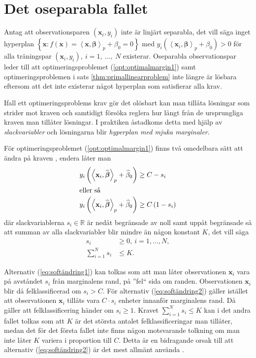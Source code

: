\documentclass[a4paper, 12pt]{report}
\theoremstyle{definition}
\theoremstyle{remark}
\newcommand{\bfbeta}{{\boldsymbol{\beta}}}
\newcommand{\bfx}{\mathbf{x}}
\newcommand{\llangle}{\left\langle}
\newcommand{\rrangle}{\right\rangle}
\newcommand{\inner}[2]{\llangle #1, #2 \rrangle}
\begin{document}
\section{Det oseparabla fallet}
Antag att observationsparen $\left(\mathbf{x}_i, y_i\right)$ inte är linjärt separabla, det vill säga inget hyperplan $\left\{\mathbf{x} : f\left(\mathbf{x}\right) = \inner{\bfx}{\bfbeta}_p + \beta_0 = 0 \right\}$ med $y_i\left(\inner{\bfx_i}{\bfbeta}_p+\beta_0\right)>0$ för alla träningspar $\left(\mathbf{x}_i,y_i\right),~i=1,~\dots,~N$ existerar. Oseparabla observationspar leder till att optimeringsproblemet (\ref{opt:optimalmargin1}) samt optimeringsproblemen i sats \ref{thm:primallinearproblem} inte längre är lösbara eftersom att det inte existerar något hyperplan som satisfierar alla krav.

Ifall ett optimeringsproblems krav gör det olösbart kan man tillåta lösningar som strider mot kraven och samtidigt försöka reglera hur långt från de ursprungliga kraven man tillåter lösningar. I praktiken åstadkoms detta med hjälp av \emph{slackvariabler} och lösningarna blir \emph{hyperplan med mjuka marginaler}.

För optimeringsproblemet (\ref{opt:optimalmargin1}) finns två omedelbara sätt att ändra på kraven \cite{ESL}, endera låter man
\begin{align}
	y_i\left(\inner{\bfx_i}{\widehat{\bfbeta}}_p+\widehat{\beta}_0\right) &\geq C-s_i\label{eq:softändring1}\\
	\intertext{eller så}
	y_i\left(\inner{\bfx_i}{\widehat{\bfbeta}}_p+\widehat{\beta}_0\right) &\geq C\left(1-s_i\right)\label{eq:softändring2}
\end{align}
där slackvariablerna $s_i\in\mathbb{R}$ är nedåt begränsade av noll samt uppåt begränsade så att summan av alla slackvariabler blir mindre än någon konstant $K$, det vill säga \begin{equation*}
\begin{aligned}
s_i&\geq0,~i=1,\dots,N,\\
\sum_{i=1}^{N}s_i&\leq K.
\end{aligned}
\end{equation*}

Alternativ (\ref{eq:softändring1}) kan tolkas som att man låter observationen $\mathbf{x}_i$ vara på avståndet $s_i$ från marginalens rand, på ''fel`` sida om randen. Observationen $\mathbf{x}_i$ blir då felklassificerad om $s_i>C$. För alternativ (\ref{eq:softändring2}) gäller istället att observationen $\mathbf{x}_i$ tillåts vara $C\cdot s_i$ enheter innanför marginalens rand. Då gäller att felklassificering händer om $s_i\geq1$. Kravet $\sum_{i=1}^{N} s_i \leq K$ kan i det andra fallet tolkas som att $K$ är det största antalet felklassificeringar man tillåter, medan det för det första fallet inte finns någon motsvarande tolkning om man inte låter $K$ variera i proportion till $C$. Detta är en bidragande orsak till att alternativ (\ref{eq:softändring2}) är det mest allmänt använda \cite{ESL}.
\end{document}
